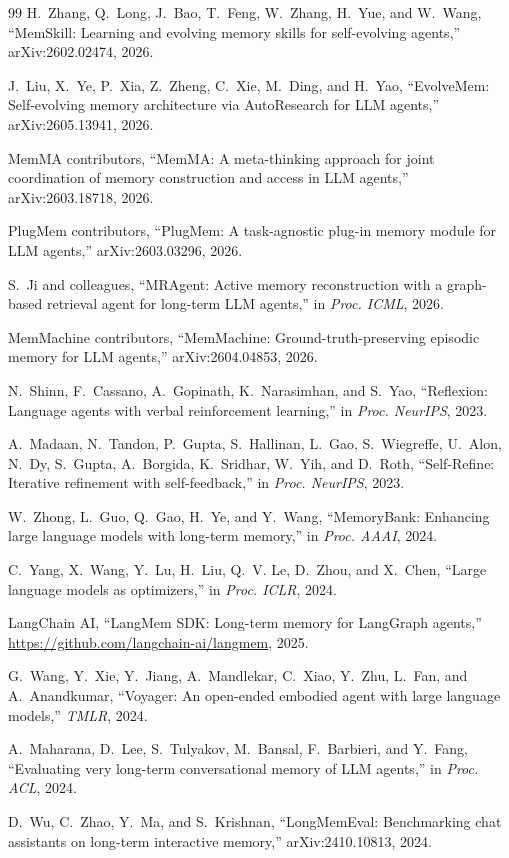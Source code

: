 \documentclass[11pt]{article}
\begin{document}
\begin{thebibliography}{99}
H.~Zhang, Q.~Long, J.~Bao, T.~Feng, W.~Zhang, H.~Yue, and W.~Wang, ``MemSkill:
Learning and evolving memory skills for self-evolving agents,'' arXiv:2602.02474,
2026.

J.~Liu, X.~Ye, P.~Xia, Z.~Zheng, C.~Xie, M.~Ding, and H.~Yao, ``EvolveMem:
Self-evolving memory architecture via AutoResearch for LLM agents,''
arXiv:2605.13941, 2026.

MemMA contributors, ``MemMA: A meta-thinking approach for joint coordination of
memory construction and access in LLM agents,'' arXiv:2603.18718, 2026.

PlugMem contributors, ``PlugMem: A task-agnostic plug-in memory module for LLM
agents,'' arXiv:2603.03296, 2026.

S.~Ji and colleagues, ``MRAgent: Active memory reconstruction with a graph-based
retrieval agent for long-term LLM agents,'' in \emph{Proc. ICML}, 2026.

MemMachine contributors, ``MemMachine: Ground-truth-preserving episodic memory
for LLM agents,'' arXiv:2604.04853, 2026.

N.~Shinn, F.~Cassano, A.~Gopinath, K.~Narasimhan, and S.~Yao, ``Reflexion:
Language agents with verbal reinforcement learning,'' in \emph{Proc. NeurIPS},
2023.

A.~Madaan, N.~Tandon, P.~Gupta, S.~Hallinan, L.~Gao, S.~Wiegreffe, U.~Alon,
N.~Dy, S.~Gupta, A.~Borgida, K.~Sridhar, W.~Yih, and D.~Roth, ``Self-Refine:
Iterative refinement with self-feedback,'' in \emph{Proc. NeurIPS}, 2023.

W.~Zhong, L.~Guo, Q.~Gao, H.~Ye, and Y.~Wang, ``MemoryBank: Enhancing
large language models with long-term memory,'' in \emph{Proc. AAAI}, 2024.

C.~Yang, X.~Wang, Y.~Lu, H.~Liu, Q.~V. Le, D.~Zhou, and X.~Chen,
``Large language models as optimizers,'' in \emph{Proc. ICLR}, 2024.

LangChain AI, ``LangMem SDK: Long-term memory for LangGraph agents,''
\url{https://github.com/langchain-ai/langmem}, 2025.

G.~Wang, Y.~Xie, Y.~Jiang, A.~Mandlekar, C.~Xiao, Y.~Zhu, L.~Fan, and A.~Anandkumar,
``Voyager: An open-ended embodied agent with large language models,''
\emph{TMLR}, 2024.

A.~Maharana, D.~Lee, S.~Tulyakov, M.~Bansal, F.~Barbieri, and Y.~Fang,
``Evaluating very long-term conversational memory of LLM agents,''
in \emph{Proc. ACL}, 2024.

D.~Wu, C.~Zhao, Y.~Ma, and S.~Krishnan, ``LongMemEval: Benchmarking chat
assistants on long-term interactive memory,'' arXiv:2410.10813, 2024.

\end{thebibliography}
\end{document}
